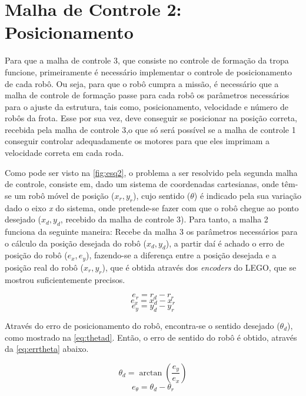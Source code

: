 \section{Malha de Controle 2: Posicionamento}
\label{sec:malha2 } 
Para que a malha de controle 3, que consiste no controle de formação da tropa funcione, primeiramente é necessário implementar o controle de posicionamento de cada robô. Ou seja, para que o robô cumpra a missão, é necessário que a malha de controle de formação passe para cada robô os parâmetros necessários para o ajuste da estrutura, tais como, posicionamento, velocidade e número de robôs da frota. Esse por sua vez, deve conseguir se posicionar na posição correta, recebida pela malha de controle 3,o que só será possível se a malha de controle 1 conseguir controlar adequadamente os motores para que eles imprimam a velocidade correta em cada roda.

Como pode ser visto na \autoref{fig:esq2}, o problema a ser resolvido pela segunda malha de controle, consiste em, dado um sistema de coordenadas cartesianas, onde têm-se um robô móvel de posição (\emph{$x_{r},y_{r}$}), cujo sentido (\emph{$\theta$}) é indicado pela sua variação dado o eixo \emph{x} do sistema, onde pretende-se fazer com que o robô chegue ao ponto desejado (\emph{$x_{d},y_{d}$}, recebido da malha de controle 3). Para tanto, a malha 2 funciona da seguinte maneira: Recebe da malha 3 os parâmetros necessários para o cálculo da posição desejada do robô (\emph{$x_{d},y_{d}$}), a partir daí é achado o erro de posição do robô (\emph{$e_{x},e_{y}$}), fazendo-se a diferença entre a posição desejada e a posição real do robô (\emph{$x_{r},y_{r}$}), que é obtida através dos \emph{encoders} do LEGO\textregistered, que se mostrou suficientemente precisos.

\begin{equation}
e_{r} = r_{d} - r_{r}
\label{eq:errr}
\end{equation}
\begin{equation}
e_{x} = x_{d} - x_{r}
\label{eq:errx}
\end{equation}
\begin{equation}
e_{y} = y_{d} - y_{r}
\label{eq:erry}
\end{equation}

Através do erro de posicionamento do robô, encontra-se o sentido desejado (\emph{$\theta_{d}$}), como mostrado na \autoref{eq:thetad}. Então, o erro de sentido do robô é obtido, através da \autoref{eq:errtheta} abaixo. 

\begin{equation}
\theta_{d} = \arctan(\dfrac{e_{y}}{e_{x}})
\label{eq:thetad}
\end{equation}
\begin{equation}
e_{\theta} = \theta_{d} - \theta_{r}
\label{eq:errtheta}
\end{equation}

